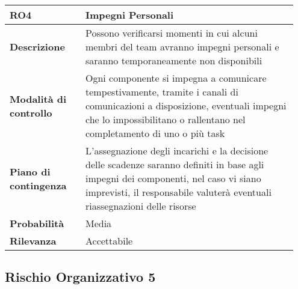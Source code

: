 \begin{table}[H]
    \bgroup
    \def\arraystretch{1.5}
    \begin{tabular} {
            | p{0.25\linewidth} | p{0.70\linewidth} |
        }
        \hline
        \textbf{RO4}                   & \textbf{Impegni Personali}                                                                                                                                                                                       \\
        \hline
        \textbf{Descrizione}           & Possono verificarsi momenti in cui alcuni membri del team avranno impegni personali e saranno temporaneamente non disponibili                                                                                    \\
        \hline
        \textbf{Modalità di controllo} & Ogni componente si impegna a comunicare tempestivamente, tramite i canali di comunicazioni a disposizione, eventuali impegni che lo impossibilitano o rallentano nel completamento di uno o più task             \\
        \hline
        \textbf{Piano di contingenza}  & L’assegnazione degli incarichi e la decisione delle scadenze saranno definiti in base agli impegni dei componenti, nel caso vi siano imprevisti, il responsabile valuterà eventuali riassegnazioni delle risorse \\
        \hline
        \textbf{Probabilità}           & Media                                                                                                                                                                                                            \\
        \hline
        \textbf{Rilevanza}             & Accettabile                                                                                                                                                                                                      \\
        \hline
    \end{tabular}
    \egroup
\end{table}

\subsection{Rischio Organizzativo 5}


